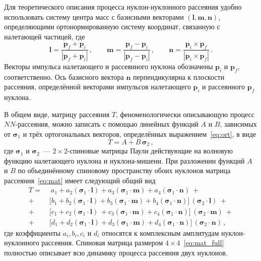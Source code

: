 Для теоретического описания процесса нуклон-нуклонного рассеяния удобно
использовать систему центра масс с базисными векторами $(\mathbf{l, m, n})$,
определяющими ортонормированную систему координат, связанную с налетающей
частицей, где
\begin{equation}
  \label{eq:ort}
  \mathbf{l} =
  \frac{\mathbf{p}_f + \mathbf{p}_i}{|\mathbf{p}_f + \mathbf{p}_i|}\,, \qquad
  \mathbf{m} =
  \frac{\mathbf{p}_f - \mathbf{p}_i}{|\mathbf{p}_f - \mathbf{p}_i|}\,, \qquad
  \mathbf{n} =
  \frac{\mathbf{p}_i \times \mathbf{p}_f}{|\mathbf{p}_i \times \mathbf{p}_f|}\,.
\end{equation}
Векторы импульса налетающего и рассеянного нуклона обозначены $\mathbf{p}_i$ и
$\mathbf{p}_f$, соответственно. Ось базисного вектора $\mathbf{n}$
перпендикулярна к плоскости рассеяния, определённой векторами импульсов
налетающего $\mathbf{p}_i$ и рассеянного $\mathbf{p}_f$ нуклона.

В общем виде, матрицу рассеяния $T$, феноменологически описывающую процесс
$NN$-рассеяния, можно записать с помощью линейных функций $A$ и $B$, зависимых
от $\boldsymbol{\sigma}_1$ и трёх ортогональных векторов, определённых
выражением~\eqref{eq:ort}, в виде
\begin{equation}
  \label{eq:mat}
  T = A + B\,\boldsymbol{\sigma}_2\,,
\end{equation}
где $\boldsymbol{\sigma}_1$ и $\boldsymbol{\sigma}_2$~--- $2 \times 2$-спиновые
матрицы Паули действующие на волновую функцию налетающего нуклона и
нуклона-мишени. При разложении функций $A$ и $B$ по объединённому спиновому
пространству обоих нуклонов матрица рассеяния~\eqref{eq:mat} имеет следующий
общий вид
\begin{equation}
  \label{eq:mat_full}
  \begin{split}
    T = \ &\ a_1 +
    a_2(\boldsymbol{\sigma}_1\cdot\mathbf{l}) +
    a_3(\boldsymbol{\sigma}_1\cdot\mathbf{m}) +
    a_4(\boldsymbol{\sigma}_1\cdot\mathbf{n})\ + \\
    +\ &\bigl[b_1 +
      b_2(\boldsymbol{\sigma}_1\cdot\mathbf{l}) +
      b_3(\boldsymbol{\sigma}_1\cdot\mathbf{m}) +
      b_4(\boldsymbol{\sigma}_1\cdot\mathbf{n})\bigr]
    \,(\boldsymbol{\sigma}_2\cdot\mathbf{l})\ + \\
    +\ &\bigl[c_1 +
      c_2(\boldsymbol{\sigma}_1\cdot\mathbf{l})\,+
      c_3(\boldsymbol{\sigma}_1\cdot\mathbf{m}) +
      c_4(\boldsymbol{\sigma}_1\cdot\mathbf{n})\bigr]
    \,(\boldsymbol{\sigma}_2\cdot\mathbf{m})\ +\\
    +\ &\bigl[d_1 +
      d_2(\boldsymbol{\sigma}_1\cdot\mathbf{l}) +
      d_3(\boldsymbol{\sigma}_1\cdot\mathbf{m}) +
      d_4(\boldsymbol{\sigma}_1\cdot\mathbf{n})\bigr]
    \,(\boldsymbol{\sigma}_2\cdot\mathbf{n})\,,
  \end{split}
\end{equation}
где коэффициенты $a_i, b_i, c_i$ и $d_i$ относятся к комплексным амплитудам
нуклон-нуклонного рассеяния. Спиновая матрица размером
$4 \times 4$~\eqref{eq:mat_full} полностью описывает всю динамику процесса
рассеяния двух нуклонов.

